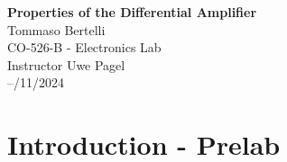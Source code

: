 \documentclass{article}
\begin{document}
	
	\mbox{}
	\vspace{10cm}
	\begin{center}
		\textbf{\Huge{Properties of the Differential Amplifier}}\\
		\bigskip
		\Large{Tommaso Bertelli}\\
		\bigskip
		\Large{CO-526-B - Electronics Lab}\\
		\bigskip
		\Large{Instructor Uwe Pagel}\\
		\bigskip
		\Large{--/11/2024}\\
	\end{center}
	\pagebreak
	
	\section{Introduction - Prelab}
\end{document}
